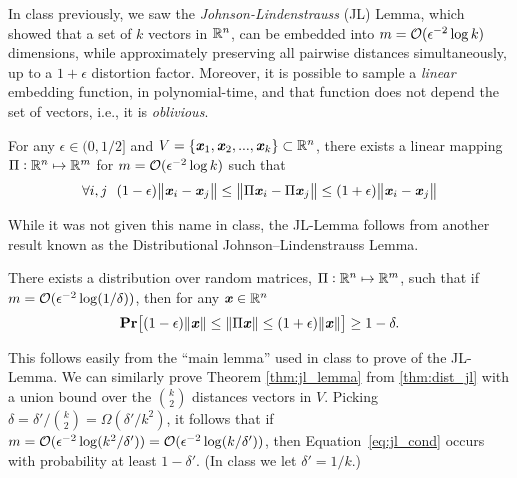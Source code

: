 In class previously, 
we saw the \textit{Johnson-Lindenstrauss} (JL) Lemma,
which showed that a set of $k$ vectors in $\mathbb R^n$,
can be embedded into $m=\mathcal{O}(\epsilon^{-2}\log k)$ dimensions,
while approximately preserving
all pairwise distances simultaneously, up to a $1+\epsilon$ distortion factor.
Moreover, it is possible to sample a \textit{linear} embedding function,
in polynomial-time, and that function does not depend the set of vectors, 
i.e., it is \textit{oblivious}.
%
\begin{theorem}
    \label{thm:jl_lemma}
    For any $\epsilon \in (0, 1/2]$ and $V = \{\boldsymbol{\mathit{x}}_1, \boldsymbol{\mathit{x}}_2, ..., \boldsymbol{\mathit{x}}_k\} \subset \mathbb R^n$,
    there exists a linear mapping $\Pi:\mathbb R^n \mapsto \mathbb R^m$ for $m =\mathcal{O}(\epsilon^{-2}\log k)$ such that
    \begin{align}
        \label{eq:jl_cond}
        \forall i,j~~(1-\epsilon) \norm{\xx_i - \xx_j} 
        \leq \norm{\Pi\xx_i - \Pi\xx_j} 
        \leq (1+\epsilon)\norm{\xx_i - \xx_j}
    \end{align}
\end{theorem}
%
While it was not given this name in class, 
the JL-Lemma follows from another result 
known as the Distributional Johnson–Lindenstrauss Lemma. 
%
\begin{theorem}
    \label{thm:dist_jl}
    There exists a distribution over random matrices, $\Pi:\mathbb R^n \mapsto \mathbb R^m$,
    such that if $m=\mathcal{O}(\epsilon^{-2}\log(1/\delta))$, then for any $\boldsymbol{\mathit{x}} \in \mathbb R^n$
    \begin{align*}
        \pr \left[ (1-\epsilon) \norm{\xx} \leq \norm{\Pi\xx} \leq (1+\epsilon)\norm{\xx} \right]
            \geq 1-\delta.
    \end{align*}
\end{theorem}
%
This follows easily from the ``main lemma'' used in class to prove of the JL-Lemma.
We can similarly prove Theorem \ref{thm:jl_lemma} from \ref{thm:dist_jl} with a union bound over the 
$\binom{k}{2}$ distances vectors in $V$.
Picking $\delta = \delta'/\binom{k}{2} = \Omega(\delta'/k^2)$, 
it follows that if $m=\mathcal{O}(\epsilon^{-2}\log(k^2/\delta'))=\mathcal{O}(\epsilon^{-2}\log(k/\delta'))$,
then Equation~\ref{eq:jl_cond} occurs with probability at least $1-\delta'$.
(In class we let $\delta' = 1/k$.)